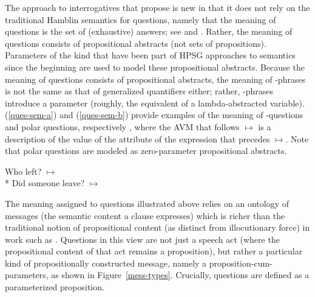 \documentclass[output=paper,biblatex,babelshorthands,newtxmath,draftmode,colorlinks,citecolor=brown]{langscibook}
\begin{document}
\largerpage[-1]
The approach to interrogatives that \citeauthor{GinzburgandSag2001} propose is new in that it does
not rely on the traditional Hamblin semantics for questions, namely that the meaning of questions is
the set of (exhaustive) answers; see \citet{Hamblin1973} and
\citet{GroenendijkandStokhoff1997}. Rather, the meaning of questions consists of propositional
abstracts (not sets of propositions). Parameters of the kind that have been part of HPSG approaches
to semantics since the beginning are used to model these propositional abstracts. Because the
meaning of questions consists of propositional abstracts, the meaning of -phrases is not
the same as that of generalized quantifiers either; rather, -phrases introduce a parameter
(roughly, the equivalent of a lambda-abstracted variable). (\ref{ques-sem-a}) and (\ref{ques-sem-b})
provide examples of the meaning of -questions and polar questions, respectively
\citep[137]{GinzburgandSag2001}, where the AVM that follows $\mapsto$ is a description of the value
of the  attribute of the expression that precedes $\mapsto$. Note that polar
questions are modeled as zero-parameter propositional abstracts.

\begin{exe}
\ex 
\begin{xlist}
\ex \label{ques-sem-a}
Who left? $\mapsto$ \\*
\ex\label{ques-sem-b}
Did someone leave? $\mapsto$ \\
\end{xlist}
\end{exe}


\largerpage[-1] 
The meaning assigned to questions illustrated above relies on an ontology of messages (the semantic
content a clause expresses) which is richer than the traditional notion of propositional content (as
distinct from illocutionary force) in work such as \citet{Searle1969}. Questions in this view are
not just a speech act (where the propositional content of that act remains a proposition), but
rather a particular kind of propositionally constructed message, namely a
proposition-cum-parameters, as shown in Figure~\ref{mess-types}. Crucially, questions are defined as
a parameterized proposition.
\end{document}
